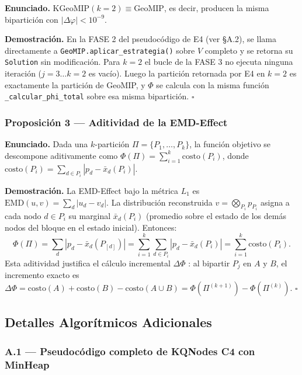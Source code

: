 \textbf{Enunciado.} $\mathrm{KGeoMIP}(k{=}2) \equiv \mathrm{GeoMIP}$, es
decir, producen la misma bipartición con $|\Delta\varphi| < 10^{-9}$.

\textbf{Demostración.}
En la FASE 2 del pseudocódigo de E4 (ver §A.2), se llama directamente a
\texttt{GeoMIP.aplicar\_estrategia()} sobre $V$ completo y se retorna su
\texttt{Solution} sin modificación.
Para $k=2$ el bucle de la FASE 3 no ejecuta ninguna iteración
($j = 3\ldots k = 2$ es vacío).
Luego la partición retornada por E4 en $k=2$ es exactamente la partición
de GeoMIP, y $\Phi$ se calcula con la misma función
\texttt{\_calcular\_phi\_total} sobre esa misma bipartición. $\square$

\subsubsection*{Proposición 3 — Aditividad de la EMD-Effect}

\textbf{Enunciado.}
Dada una $k$-partición $\Pi = \{P_1, \ldots, P_k\}$,
la función objetivo se descompone aditivamente como
$\Phi(\Pi) = \sum_{i=1}^{k} \mathrm{costo}(P_i)$,
donde $\mathrm{costo}(P_i) = \sum_{d \in P_i} \left| p_d - \bar{x}_d(P_i) \right|$.

\textbf{Demostración.}
La EMD-Effect bajo la métrica $L_1$ es
$\mathrm{EMD}(u, v) = \sum_d |u_d - v_d|$.
La distribución reconstruida $v = \bigotimes_{P_i} p_{P_i}$ asigna a cada
nodo $d \in P_i$ su marginal $\bar{x}_d(P_i)$ (promedio sobre el estado
de los demás nodos del bloque en el estado inicial).
Entonces:
\[
  \Phi(\Pi)
    = \sum_d \left| p_d - \bar{x}_d(P_{[d]}) \right|
    = \sum_{i=1}^{k} \sum_{d \in P_i} \left| p_d - \bar{x}_d(P_i) \right|
    = \sum_{i=1}^{k} \mathrm{costo}(P_i).
\]
Esta aditividad justifica el cálculo incremental $\Delta\Phi$ :
al bipartir $P_j$ en $A$ y $B$, el incremento exacto es
$\Delta\Phi = \mathrm{costo}(A) + \mathrm{costo}(B) - \mathrm{costo}(A \cup B)
= \Phi(\Pi^{(k+1)}) - \Phi(\Pi^{(k)})$. $\square$

\subsection{Detalles Algorítmicos Adicionales}
\label{sec:apendice_algoritmos}

\subsubsection*{A.1 — Pseudocódigo completo de KQNodes C4 con MinHeap}

